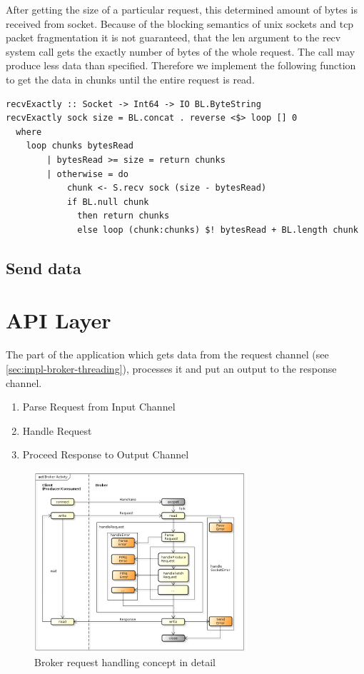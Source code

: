 After getting the size of a particular request, this determined amount of bytes
is received from socket. Because of the blocking semantics of unix sockets and
tcp packet fragmentation it is not guaranteed, that the len argument to the recv
system call gets the exactly number of bytes of the whole request. The call may produce
less data than specified. Therefore we implement the following function to get
the data in
chunks until the entire request is read. 

\begin{lstlisting}
recvExactly :: Socket -> Int64 -> IO BL.ByteString 
recvExactly sock size = BL.concat . reverse <$> loop [] 0 
  where
    loop chunks bytesRead
        | bytesRead >= size = return chunks
        | otherwise = do  
            chunk <- S.recv sock (size - bytesRead)
            if BL.null chunk 
              then return chunks 
              else loop (chunk:chunks) $! bytesRead + BL.length chunk 
\end{lstlisting}

\subsection{Send data}


\section{API Layer}
The part of the application which gets data from the request channel (see
\ref{sec:impl-broker-threading}), processes
it and put an output to the response channel. 

\begin{enumerate}
\item Parse Request from Input Channel 
\item Handle Request
\item Proceed Response to Output Channel
\end{enumerate}


\begin{figure}[H]
    \centering
    \includegraphics[width=0.7\textwidth]{images/broker-activity-detail.png}
    \caption{Broker request handling concept in detail}
    \label{fig:broker-activity-detail.png}
\end{figure}

